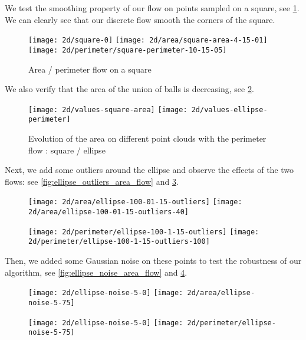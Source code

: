 We test the smoothing property of our flow on points sampled on a square, see
\ref{fig:area_perimeter_flow_square}. We can clearly see that our discrete flow
smooth the corners of the square.

\begin{figure}[h]
    \centering
    \texttt{[image: 2d/square-0]}
    \texttt{[image: 2d/area/square-area-4-15-01]}
    \texttt{[image: 2d/perimeter/square-perimeter-10-15-05]}
    \caption{Area / perimeter flow on a square}
    \label{fig:area_perimeter_flow_square}
\end{figure}

We also verify that the area of the union of balls is decreasing, see
\ref{fig:area_time_decrease}.

\begin{figure}[h]
    \centering
    \texttt{[image: 2d/values-square-area]}
    \texttt{[image: 2d/values-ellipse-perimeter]}
    \caption{Evolution of the area on different point clouds with the perimeter
        flow : square / ellipse}
    \label{fig:area_time_decrease}
\end{figure}

Next, we add some outliers around the ellipse and observe the effects of the two
flows: see \ref{fig:ellipse_outliers_area_flow} and
\ref{fig:ellipse_outliers_perimeter_flow}.

\begin{figure}[h]
    \centering

    \texttt{[image: 2d/area/ellipse-100-01-15-outliers]}
    \texttt{[image: 2d/area/ellipse-100-01-15-outliers-40]}
    \label{fig:ellipse_outliers_area_flow}

    \texttt{[image: 2d/perimeter/ellipse-100-1-15-outliers]}
    \texttt{[image: 2d/perimeter/ellipse-100-1-15-outliers-100]}
    \label{fig:ellipse_outliers_perimeter_flow}
\end{figure}

Then, we added some Gaussian noise on these points to test the robustness of our
algorithm, see \ref{fig:ellipse_noise_area_flow} and
\ref{fig:ellipse_noise_perimeter_flow}.

\begin{figure}[h]
    \centering

    \texttt{[image: 2d/ellipse-noise-5-0]}
    \texttt{[image: 2d/area/ellipse-noise-5-75]}
    \label{fig:ellipse_noise_area_flow}

    \texttt{[image: 2d/ellipse-noise-5-0]}
    \texttt{[image: 2d/perimeter/ellipse-noise-5-75]}
    \label{fig:ellipse_noise_perimeter_flow}
\end{figure}

